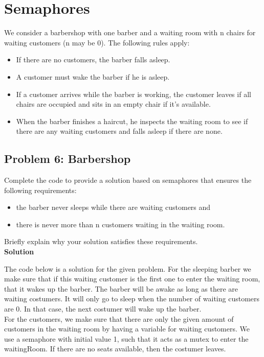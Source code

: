\section{Semaphores}

We consider a barbershop with one barber and a waiting room with n chairs for waiting customers
(n may be 0). The following rules apply:

\begin{itemize}
    \item If there are no customers, the barber falls asleep.
    \item A customer must wake the barber if he is asleep.
    \item If a customer arrives while the barber is working, the customer leaves if all chairs are
    occupied and sits in an empty chair if it’s available.
    \item When the barber finishes a haircut, he inspects the waiting room to see if there are any
    waiting customers and falls asleep if there are none.
\end{itemize}


\subsection{Problem 6: Barbershop}

Complete the code to provide a solution based on semaphores
that ensures the following requirements:
\begin{itemize}
    \item the barber never sleeps while there are waiting customers and
    \item there is never more than n customers waiting in the waiting room.
\end{itemize}

Briefly explain why your solution satisfies these requirements. \\

\textbf{Solution}

The code below is a solution for the given problem. 
For the sleeping barber we make sure that if this waiting customer is the first one to enter the waiting room, that it wakes up the barber. 
The barber will be awake as long as there are waiting costumers. It will only go to sleep when the number of waiting customers are 0. In that case, the next costumer will wake up the barber. \\

For the customers, we make sure that there are only the given amount of customers in the waiting room by having a variable for waiting customers. 
We use a semaphore with initial value 1, such that it acts as a mutex to enter the waitingRoom. If there are no seats available, then the costumer leaves.  

